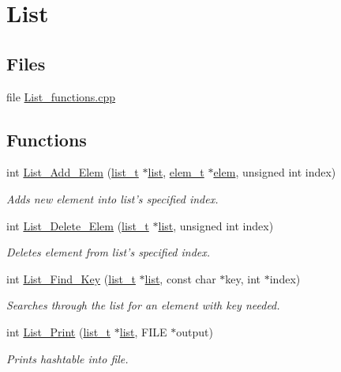 \hypertarget{group__list}{\section{List}
\label{group__list}
}
\subsection*{Files}
\begin{DoxyCompactItemize}
\item 
file \hyperlink{List__functions_8cpp}{List\-\_\-functions.\-cpp}
\end{DoxyCompactItemize}
\subsection*{Functions}
\begin{DoxyCompactItemize}
\item 
int \hyperlink{group__list_gacc2fd7b733d7485754042bcd16f9ae73}{List\-\_\-\-Add\-\_\-\-Elem} (\hyperlink{structlist}{list\-\_\-t} $\ast$\hyperlink{structlist}{list}, \hyperlink{structelem}{elem\-\_\-t} $\ast$\hyperlink{structelem}{elem}, unsigned int index)
\begin{DoxyCompactList}\small\item\em Adds new element into list's specified index. \end{DoxyCompactList}\item 
int \hyperlink{group__list_ga7a77a96abbdf34f11a88b9d113259090}{List\-\_\-\-Delete\-\_\-\-Elem} (\hyperlink{structlist}{list\-\_\-t} $\ast$\hyperlink{structlist}{list}, unsigned int index)
\begin{DoxyCompactList}\small\item\em Deletes element from list's specified index. \end{DoxyCompactList}\item 
int \hyperlink{group__list_gabaa3870d04053e03b767e4b241ef976c}{List\-\_\-\-Find\-\_\-\-Key} (\hyperlink{structlist}{list\-\_\-t} $\ast$\hyperlink{structlist}{list}, const char $\ast$key, int $\ast$index)
\begin{DoxyCompactList}\small\item\em Searches through the list for an element with key needed. \end{DoxyCompactList}\item 
int \hyperlink{group__list_gad1517c4849acea510f077bd38671e316}{List\-\_\-\-Print} (\hyperlink{structlist}{list\-\_\-t} $\ast$\hyperlink{structlist}{list}, F\-I\-L\-E $\ast$output)
\begin{DoxyCompactList}\small\item\em Prints hashtable into file. \end{DoxyCompactList}\end{DoxyCompactItemize}


